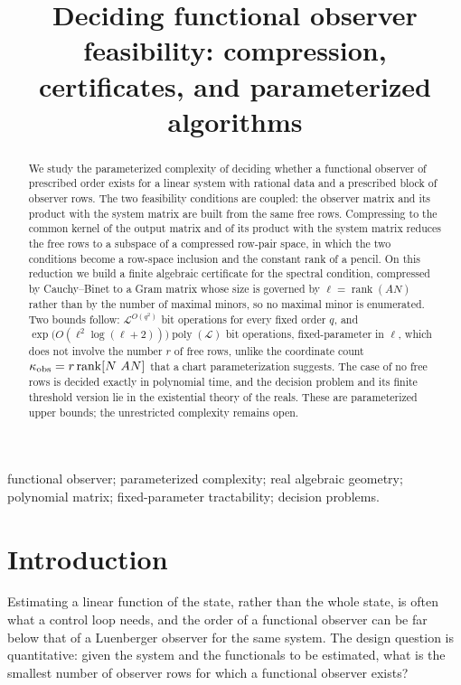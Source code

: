 \documentclass[journal]{IEEEtran}
\theoremstyle{plainn}
\theoremstyle{remark}
\begin{document}
\title{Deciding functional observer feasibility: compression, certificates, and
parameterized algorithms}
\author{}
\maketitle

\begin{abstract}
We study the parameterized complexity of deciding whether a functional observer of prescribed
order exists for a linear system with rational data and a prescribed block of observer rows. The two
feasibility conditions are coupled: the observer matrix and its product with the system matrix are
built from the same free rows. Compressing to the common kernel of the output matrix and of its
product with the system matrix reduces the free rows to a subspace of a compressed row-pair space, in
which the two conditions become a row-space inclusion and the constant rank of a pencil. On this
reduction we build a finite algebraic certificate for the spectral condition, compressed by
Cauchy--Binet to a Gram matrix whose size is governed by $\ell=\operatorname{rank}(AN)$ rather than by
the number of maximal minors, so no maximal minor is enumerated. Two bounds follow: $\mathcal L^{O(q^2)}$
bit operations for every fixed order $q$, and
$\exp\bigl(O(\ell^2\log(\ell+2))\bigr)\operatorname{poly}(\mathcal L)$ bit operations, fixed-parameter
in $\ell$, which does not involve the number $r$ of free rows, unlike the coordinate count
$\kappa_{\rm obs}=r\operatorname{rank}[N\ AN]$ that a chart parameterization suggests. The case of no
free rows is decided exactly in polynomial time, and the decision problem and its finite threshold
version lie in the existential theory of the reals. These are parameterized upper bounds; the
unrestricted complexity remains open.
\end{abstract}

\begin{IEEEkeywords}
functional observer; parameterized complexity; real algebraic geometry; polynomial matrix; fixed-parameter tractability; decision problems.
\end{IEEEkeywords}

\section{Introduction}\label{sec:intro}

Estimating a linear function of the state, rather than the whole state, is often what a control loop
needs, and the order of a functional observer can be far below that of a Luenberger observer for the
same system. The design question is quantitative: given the system and the functionals to be
estimated, what is the smallest number of observer rows for which a functional observer exists?
\end{document}
